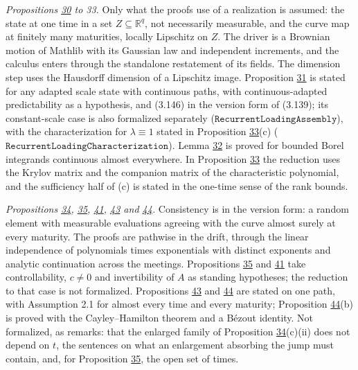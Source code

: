 \documentclass[11pt]{article}
\begin{document}
\emph{Propositions \hyperref[res:Proposition-30]{30} to 33.} Only what the proofs use of a realization is assumed: the state at one time in a set \(Z\subseteq\mathbb R^q\), not necessarily measurable, and the curve map at finitely many maturities, locally Lipschitz on \(Z\). The driver is a Brownian motion of Mathlib with its Gaussian law and independent increments, and the calculus enters through the standalone restatement of its fields. The dimension step uses the Hausdorff dimension of a Lipschitz image. Proposition \hyperref[res:Proposition-31]{31} is stated for any adapted scale state with continuous paths, with continuous-adapted predictability as a hypothesis, and (3.146) in the version form of (3.139); its constant-scale case is also formalized separately (\(\texttt{RecurrentLoadingAssembly}\)), with the characterization for \(\lambda\equiv1\) stated in Proposition \hyperref[res:Proposition-33]{33}(c) (\(\texttt{RecurrentLoadingCharacterization}\)). Lemma \hyperref[res:Lemma-32]{32} is proved for bounded Borel integrands continuous almost everywhere. In Proposition \hyperref[res:Proposition-33]{33} the reduction uses the Krylov matrix and the companion matrix of the characteristic polynomial, and the sufficiency half of (c) is stated in the one-time sense of the rank bounds.

\emph{Propositions \hyperref[res:Proposition-34]{34}, \hyperref[res:Proposition-35]{35}, \hyperref[res:Proposition-41]{41}, \hyperref[res:Proposition-43]{43} and \hyperref[res:Proposition-44]{44}.} Consistency is in the version form: a random element with measurable evaluations agreeing with the curve almost surely at every maturity. The proofs are pathwise in the drift, through the linear independence of polynomials times exponentials with distinct exponents and analytic continuation across the meetings. Propositions \hyperref[res:Proposition-35]{35} and \hyperref[res:Proposition-41]{41} take controllability, \(c\neq0\) and invertibility of \(A\) as standing hypotheses; the reduction to that case is not formalized. Propositions \hyperref[res:Proposition-43]{43} and \hyperref[res:Proposition-44]{44} are stated on one path, with Assumption 2.1 for almost every time and every maturity; Proposition \hyperref[res:Proposition-44]{44}(b) is proved with the Cayley--Hamilton theorem and a Bézout identity. Not formalized, as remarks: that the enlarged family of Proposition \hyperref[res:Proposition-34]{34}(c)(ii) does not depend on \(t\), the sentences on what an enlargement absorbing the jump must contain, and, for Proposition \hyperref[res:Proposition-35]{35}, the open set of times.
\end{document}
